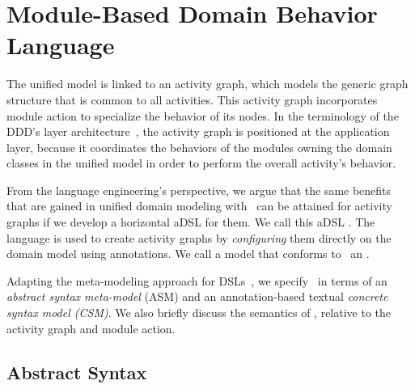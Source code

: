 %
\section{Module-Based Domain Behavior Language}\label{sect:agl} %
The unified model is linked to an activity graph, which models the generic graph structure that is common to all activities. This activity graph incorporates module action to specialize the behavior of its nodes.
In the terminology of the DDD's layer architecture~\cite{evans_domain-driven_2004}, the activity graph is positioned at the application layer, because it coordinates the behaviors of the modules owning the domain classes in the unified model in order to perform the overall activity's behavior.

From the language engineering's perspective, we argue that the same benefits that are gained in unified domain modeling with \dcsl~can be attained for activity graphs if we develop a horizontal aDSL for them. We call this aDSL .
The language is used to create activity graphs by \textit{configuring} them directly on the domain model using annotations. We call a model that conforms to \agl~an .

Adapting the meta-modeling approach for DSLs~\cite{kleppe_software_2008}, we specify \agl~in terms of an \textit{abstract syntax meta-model} (ASM) and an annotation-based textual \textit{concrete syntax model (CSM)}. We also briefly discuss the semantics of \agl, relative to the activity graph and module action.
%
\subsection{Abstract Syntax} \label{sect:agl-abstractSyntax}


